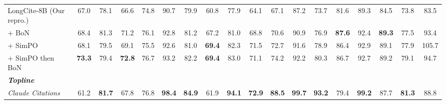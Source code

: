 \begin{table*}[t]
{\begin{tabular}{l|ccc|ccc|ccc|ccc|ccc|c|c}
			LongCite-8B (Our repro.)       &      67.0      &      78.1      &      66.6      &      74.8      &      90.7      &      79.9      &      60.8      &      77.9      &      64.1      &      67.1      &      87.2      &      73.7      &      81.6      &      89.3      &      84.5      &      73.8      &      83.5       \\
			+ BoN                          &      68.4      &      81.3      &      71.2      &      76.1      &      92.8      &      81.2      &      67.2      &      81.0      &      68.8      &      70.6      &      90.9      &      76.9      &  \bf 87.6      &      92.4      &  \bf 89.3      &      77.5      &      93.4       \\
			+ SimPO                        &      68.1      &      79.5      &      69.1      &      75.5      &      92.6      &      81.0      &  \bf 69.4      &      82.3      &      71.5      &      72.7      &      91.6      &      78.9      &      86.4      &      92.9      &      89.1      &      77.9      &      105.7      \\
			+ SimPO then BoN               &    \bf 73.3    &      79.4      &    \bf 72.8    &      76.7      &      93.2      &      82.2      &  \bf 69.4      &      83.0      &      71.1      &      74.2      &      92.2      &      80.3      &      86.7      &      92.7      &      89.2      &      79.1      &      94.7       \\

			\midrule
			\multicolumn{18}{l}{\textit{\bf Topline}}                                                                                                                                                                                                                                                            \\
                \midrule
                \it Claude Citations      &      61.2      &      \bf 81.7   &      67.8      &      76.8      &  \bf 98.4      &  \bf 84.9      &      61.9      &  \bf 94.1      &  \bf 72.9      &  \bf 88.5      &  \bf 99.7      &  \bf 93.2      &      79.4      &  \bf 99.2      &      87.7      &  \bf 81.3      &      88.8 \\
			\bottomrule
		\end{tabular}
	}
\end{table*}